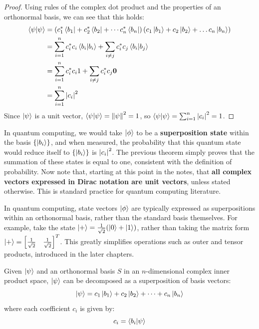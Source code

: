 \documentclass[12pt]{article}
\begin{document}
\begin{proof}
    Using rules of the complex dot product and the properties of an orthonormal basis, we can see that this holds:
    \begin{align}
        \braket{\psi}{\psi} &= \left(c_1^* \bra{b_1} + c_2^* \bra{b_2} + \cdots c_n^* \bra{b_n}\right) \left(c_1 \ket{b_1} + c_2 \ket{b_2} + \ldots c_n \ket{b_n}\right) \\
        &= \sum_{i=1}^{n} c_i^* c_i \braket{b_i}{b_i} + \sum_{i \neq j} c_i^* c_j \braket{b_i}{b_j} \\
        &= \sum_{i=1}^{n} c_i^* c_i 1 + \sum_{i \neq j} c_i^* c_j \mathbf{0} \\
        &= \sum_{i=1}^{n} \abs{c_i}^2
    \end{align}
    Since $\ket{\psi}$ is a unit vector, $\braket{\psi}{\psi} = \norm{\psi}^2 = 1$, so $\braket{\psi}{\psi} = \sum_{i=1}^{n} \abs{c_i}^2 = 1$.
\end{proof}

In quantum computing, we would take $\ket{\phi}$ to be a \textbf{superposition state} within the basis $\left\{\ket{b_i}\right\}$, and when measured, the probability that this quantum state would reduce itself to $\left\{\ket{b_i}\right\}$ is $\abs{c_i}^2$. The previous theorem simply proves that the summation of these states is equal to one, consistent with the definition of probability. Now note that, starting at this point in the notes, that \textbf{all complex vectors expressed in Dirac notation are unit vectors}, unless stated otherwise. This is standard practice for quantum computing literature. 

In quantum computing, state vectors $\ket{\phi}$ are typically expressed as superpositions within an orthonormal basis, rather than the standard basis themselves. For example, take the state $\ket{+} = \frac{1}{\sqrt{2}}(\ket{0} + \ket{1})$, rather than taking the matrix form $\ket{+} = \left[\frac{1}{\sqrt{2}} \quad \frac{1}{\sqrt{2}}\right]^T$. This greatly simplifies operations such as outer and tensor products, introduced in the later chapters. 

\begin{theorem}
    Given $\ket{\psi}$ and an orthonormal basis $S$ in an $n$-dimensional complex inner product space, $\ket{\psi}$ can be decomposed as a superposition of basis vectors:
    $$\ket{\psi} = c_1 \ket{b_1} + c_2 \ket{b_2} + \cdots + c_n \ket{b_n}$$
    where each coefficient $c_i$ is given by:
    $$c_i = \braket{b_i}{\psi}$$
\end{theorem}
\end{document}
